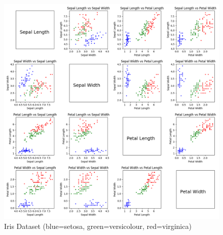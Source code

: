 \documentclass{article}
\begin{document}
\begin{figure}[H]
\centering
\includegraphics[scale=0.4]{./img/iris.png}
\caption{Iris Dataset (blue=setosa, green=versicolour, red=virginica)}
\end{figure}
\end{document}
